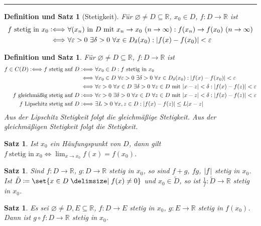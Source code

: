 \documentclass[a4paper]{article}
\newcounter{Sec}
\theoremstyle{marginbreak}
\newtheorem{satz}[definition]{Satz}
\newtheorem{defsatz}[definition]{Definition und Satz}
\newcommand{\sep}{%
	\rule{\textwidth}{0.3pt}%
	\stepcounter{Sec}%
	}
\newcommand{\defiff}{\mathrel{\vcentcolon\Longleftrightarrow}}
\newcommand{\en}{~(n\to\infty)}
\begin{document}
	\sep
	\begin{defsatz}[Stetigkeit]
		Für $\varnothing\neq D\subseteq\mathbb{R}$, $x_0\in D$, $f\colon D\to\mathbb{R}$
		ist
		\begin{align*}
			f~\text{stetig in}~x_0
			\defiff&~\forall(x_n)~\text{in}~D~\text{mit}~x_n\to x_0\en:f(x_n)\to f(x_0)\en\\
			\Longleftrightarrow&~\forall\varepsilon>0~\exists\delta>0~\forall x\in D_\delta(x_0):\abs{f(x)-f(x_0)}<\varepsilon
		\end{align*}
	\end{defsatz}
	\begin{defsatz}
		Für $\varnothing\neq D\subseteq\mathbb{R}$, $f\colon D\to\mathbb{R}$
		ist
		\begin{align*}
			f\in C(D)\defiff
			f~\text{stetig auf $D$}
			\defiff&~\forall x_0\in D:f~\text{stetig in $x_0$}\\
			\Longleftrightarrow&~\forall x_0\in D~\forall\varepsilon>0~\exists\delta>0~\forall x\in D_\delta(x_0):\abs{f(x)-f(x_0)}<\varepsilon\\
			\Longleftrightarrow&~\forall\varepsilon>0~\forall x\in D~\exists\delta>0~\forall z\in D~\text{mit}~\abs{x-z}<\delta:\abs{f(x)-f(z)}<\varepsilon\\
			f~\text{gleichmäßig stetig auf $D$}
			\defiff&~\forall\varepsilon>0~\exists\delta>0~\forall x\in D~\forall z\in D~\text{mit}~\abs{x-z}<\delta:\abs{f(x)-f(z)}<\varepsilon\\
			f~\text{Lipschitz stetig auf $D$}
			\defiff&~\exists L>0~\forall x,z\in D:\abs{f(x)-f(z)}\leq L\abs{x-z}
		\end{align*}
		Aus der Lipschitz Stetigkeit folgt die gleichmäßige Stetigkeit.
		Aus der gleichmäßigen Stetigkeit folgt die Stetigkeit.
	\end{defsatz}
	\begin{satz}
		Ist $x_0$ ein Häufungspunkt von $D$, dann gilt $f~\text{stetig in}~x_0\iff\lim_{x\to x_0}f(x)=f(x_0)$.
	\end{satz}
	\begin{satz}
		Sind $f\colon D\to\mathbb{R}$, $g\colon D\to\mathbb{R}$ stetig in $x_0$, so
		sind $f + g$, $fg$, $\abs{f}$ stetig in $x_0$. Ist $\tilde{D}\coloneqq\set{x\in D\given f(x)\neq0}$
		und $x_0\in\tilde{D}$, so ist $\frac{1}{f}\colon\tilde{D}\to\mathbb{R}$ stetig in
		$x_0$.
	\end{satz}
	\begin{satz}
		Es sei $\varnothing\neq D, E\subseteq\mathbb{R}$, $f\colon D\to E$ stetig in $x_0$,
		$g\colon E\to\mathbb{R}$ stetig in $f(x_0)$. Dann ist $g\circ f\colon D\to\mathbb{R}$
		stetig in $x_0$.
	\end{satz}
\end{document}
